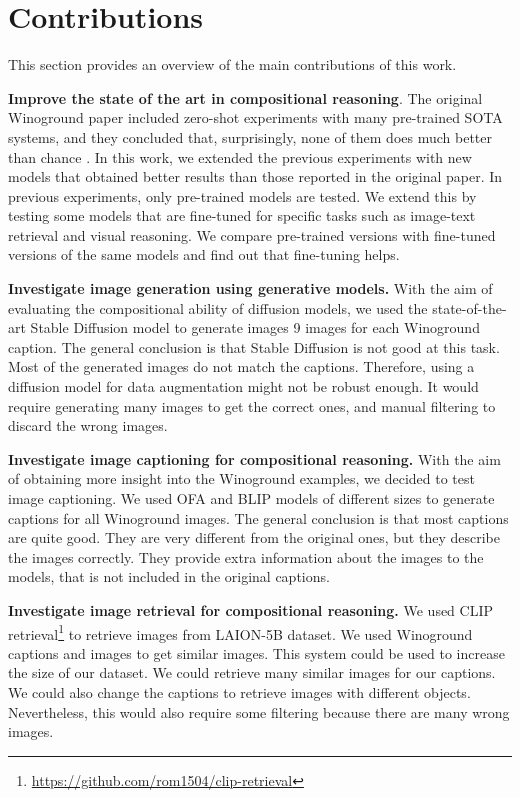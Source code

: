 \section{Contributions}

This section provides an overview of the main contributions of this work.

\textbf{Improve the state of the art in compositional reasoning}. The original Winoground paper included zero-shot experiments with many pre-trained SOTA systems, and they concluded that, surprisingly, none of them does much better than chance \cite{thrush2022winoground}. In this work, we extended the previous experiments with new models that obtained better results than those reported in the original paper. In previous experiments, only pre-trained models are tested. We extend this by testing some models that are fine-tuned for specific tasks such as image-text retrieval and visual reasoning. We compare pre-trained versions with fine-tuned versions of the same models and find out that fine-tuning helps.

\textbf{Investigate image generation using generative models.} With the aim of evaluating the compositional ability of diffusion models, we used the state-of-the-art Stable Diffusion model \cite{rombach2021highresolution} to generate images 9 images for each Winoground caption. The general conclusion is that Stable Diffusion is not good at this task. Most of the generated images do not match the captions. Therefore, using a diffusion model for data augmentation might not be robust enough. It would require generating many images to get the correct ones, and manual filtering to discard the wrong images.

\textbf{Investigate image captioning for compositional reasoning.} With the aim of obtaining more insight into the Winoground examples, we decided to test image captioning. We used OFA \cite{wang2022unifying} and BLIP \cite{li2022blip} models of different sizes to generate captions for all Winoground images. The general conclusion is that most captions are quite good. They are very different from the original ones, but they describe the images correctly. They provide extra information about the images to the models, that is not included in the original captions.

\textbf{Investigate image retrieval for compositional reasoning.} We used CLIP retrieval\footnote{\url{https://github.com/rom1504/clip-retrieval}} to retrieve images from LAION-5B \cite{schuhmann2022laionb} dataset. We used Winoground captions and images to get similar images. This system could be used to increase the size of our dataset. We could retrieve many similar images for our captions. We could also change the captions to retrieve images with different objects. Nevertheless, this would also require some filtering because there are many wrong images.

